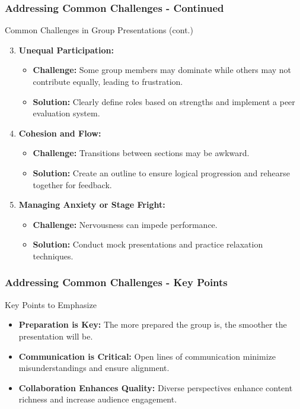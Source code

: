 \documentclass[aspectratio=169]{beamer}
\begin{document}
\begin{frame}[fragile]
    \frametitle{Addressing Common Challenges - Continued}
    \begin{block}{Common Challenges in Group Presentations (cont.)}
        \begin{enumerate}
            \setcounter{enumi}{2} %
            \item \textbf{Unequal Participation:}
            \begin{itemize}
                \item \textbf{Challenge:} Some group members may dominate while others may not contribute equally, leading to frustration.
                \item \textbf{Solution:} Clearly define roles based on strengths and implement a peer evaluation system.
            \end{itemize}

            \item \textbf{Cohesion and Flow:}
            \begin{itemize}
                \item \textbf{Challenge:} Transitions between sections may be awkward.
                \item \textbf{Solution:} Create an outline to ensure logical progression and rehearse together for feedback.
            \end{itemize}

            \item \textbf{Managing Anxiety or Stage Fright:}
            \begin{itemize}
                \item \textbf{Challenge:} Nervousness can impede performance.
                \item \textbf{Solution:} Conduct mock presentations and practice relaxation techniques.
            \end{itemize}
        \end{enumerate}
    \end{block}
\end{frame}

\begin{frame}[fragile]
    \frametitle{Addressing Common Challenges - Key Points}
    \begin{block}{Key Points to Emphasize}
        \begin{itemize}
            \item \textbf{Preparation is Key:} The more prepared the group is, the smoother the presentation will be.
            \item \textbf{Communication is Critical:} Open lines of communication minimize misunderstandings and ensure alignment.
            \item \textbf{Collaboration Enhances Quality:} Diverse perspectives enhance content richness and increase audience engagement.
        \end{itemize}
    \end{block}
\end{frame}
\end{document}
